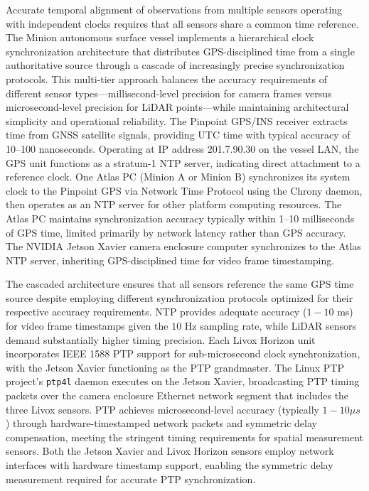 Accurate temporal alignment of observations from multiple sensors operating with independent clocks requires that all sensors share a common time reference. The Minion autonomous surface vessel implements a hierarchical clock synchronization architecture that distributes GPS-disciplined time from a single authoritative source through a cascade of increasingly precise synchronization protocols. This multi-tier approach balances the accuracy requirements of different sensor types---millisecond-level precision for camera frames versus microsecond-level precision for LiDAR points---while maintaining architectural simplicity and operational reliability.
The Pinpoint GPS/INS receiver extracts time from GNSS satellite signals, providing UTC time with typical accuracy of 10--100 nanoseconds. Operating at IP address 201.7.90.30 on the vessel LAN, the GPS unit functions as a stratum-1 \ac{NTP} server, indicating direct attachment to a reference clock. One Atlas PC (Minion A or Minion B) synchronizes its system clock to the Pinpoint GPS via Network Time Protocol using the Chrony daemon, then operates as an \ac{NTP} server for other platform computing resources. The Atlas PC maintains synchronization accuracy typically within 1--10 milliseconds of GPS time, limited primarily by network latency rather than GPS accuracy. The NVIDIA Jetson Xavier camera enclosure computer synchronizes to the Atlas \ac{NTP} server, inheriting GPS-disciplined time for video frame timestamping.

The cascaded architecture ensures that all sensors reference the same GPS time source despite employing different synchronization protocols optimized for their respective accuracy requirements.
\ac{NTP} provides adequate accuracy ($1-10$ ms) for video frame timestamps given the $10$ Hz sampling rate, while LiDAR sensors demand substantially higher timing precision. 
Each Livox Horizon unit incorporates IEEE 1588 \ac{PTP} support for sub-microsecond clock synchronization, with the Jetson Xavier functioning as the \ac{PTP} grandmaster. 
The Linux \ac{PTP} project's \texttt{ptp4l} daemon executes on the Jetson Xavier, broadcasting \ac{PTP} timing packets over the camera enclosure Ethernet network segment that includes the three Livox sensors. 
\ac{PTP} achieves microsecond-level accuracy (typically $1-10 \mu s$) through hardware-timestamped network packets and symmetric delay compensation, meeting the stringent timing requirements for spatial measurement sensors. 
Both the Jetson Xavier and Livox Horizon sensors employ network interfaces with hardware timestamp support, enabling the symmetric delay measurement required for accurate \ac{PTP} synchronization.

